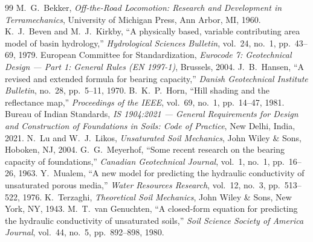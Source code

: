 \documentclass[11pt,a4paper]{article}
\theoremstyle{definition}
\theoremstyle{remark}
\begin{document}
\begin{thebibliography}{99}
 M.~G.~Bekker, \emph{Off-the-Road Locomotion: Research and Development in Terramechanics}, University of Michigan Press, Ann Arbor, MI, 1960.
 K.~J.~Beven and M.~J.~Kirkby, ``A physically based, variable contributing area model of basin hydrology,'' \emph{Hydrological Sciences Bulletin}, vol.~24, no.~1, pp.~43--69, 1979.
 European Committee for Standardization, \emph{Eurocode 7: Geotechnical Design --- Part 1: General Rules (EN 1997-1)}, Brussels, 2004.
 J.~B.~Hansen, ``A revised and extended formula for bearing capacity,'' \emph{Danish Geotechnical Institute Bulletin}, no.~28, pp.~5--11, 1970.
 B.~K.~P.~Horn, ``Hill shading and the reflectance map,'' \emph{Proceedings of the IEEE}, vol.~69, no.~1, pp.~14--47, 1981.
 Bureau of Indian Standards, \emph{IS 1904:2021 --- General Requirements for Design and Construction of Foundations in Soils: Code of Practice}, New Delhi, India, 2021.
 N.~Lu and W.~J.~Likos, \emph{Unsaturated Soil Mechanics}, John Wiley \& Sons, Hoboken, NJ, 2004.
 G.~G.~Meyerhof, ``Some recent research on the bearing capacity of foundations,'' \emph{Canadian Geotechnical Journal}, vol.~1, no.~1, pp.~16--26, 1963.
 Y.~Mualem, ``A new model for predicting the hydraulic conductivity of unsaturated porous media,'' \emph{Water Resources Research}, vol.~12, no.~3, pp.~513--522, 1976.
 K.~Terzaghi, \emph{Theoretical Soil Mechanics}, John Wiley \& Sons, New York, NY, 1943.
 M.~T.~van Genuchten, ``A closed-form equation for predicting the hydraulic conductivity of unsaturated soils,'' \emph{Soil Science Society of America Journal}, vol.~44, no.~5, pp.~892--898, 1980.
\end{thebibliography}
\end{document}
